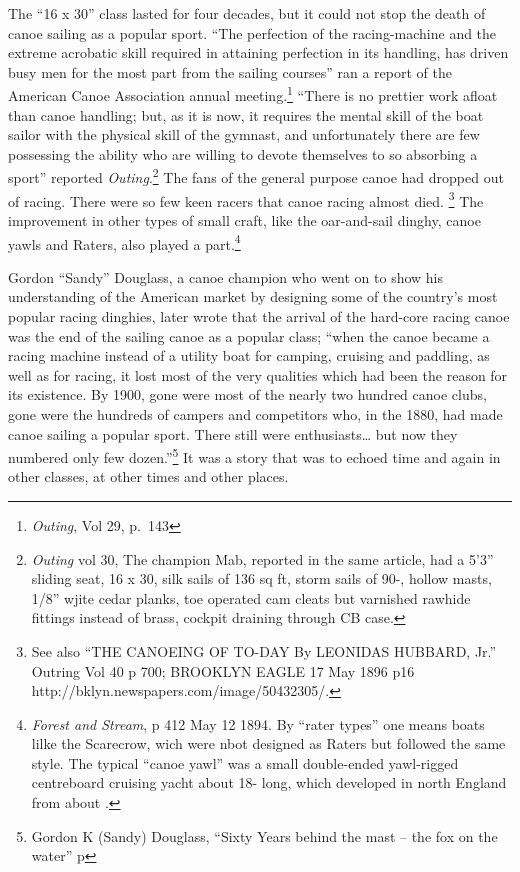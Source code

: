\documentclass[
  letterpaper,
]{scrbook}
\begin{document}
The ``16 x 30'' class lasted for four decades, but it could not stop the
death of canoe sailing as a popular sport. ``The perfection of the
racing-machine and the extreme acrobatic skill required in attaining
perfection in its handling, has driven busy men for the most part from
the sailing courses'' ran a report of the American Canoe Association
annual meeting.\footnote{\emph{Outing}, Vol 29, p.~143} ``There is no
prettier work afloat than canoe handling; but, as it is now, it requires
the mental skill of the boat sailor with the physical skill of the
gymnast, and unfortunately there are few possessing the ability who are
willing to devote themselves to so absorbing a sport'' reported
\emph{Outing}.\footnote{\emph{Outing} vol 30, The champion Mab, reported
  in the same article, had a 5'3'' sliding seat, 16 x 30, silk sails of
  136 sq ft, storm sails of 90-, hollow masts, 1/8'' wjite cedar planks,
  toe operated cam cleats but varnished rawhide fittings instead of
  brass, cockpit draining through CB case.} The fans of the general
purpose canoe had dropped out of racing. There were so few keen racers
that canoe racing almost died. \footnote{See also ``THE CANOEING OF
  TO-DAY By LEONIDAS HUBBARD, Jr.'' Outring Vol 40 p 700; BROOKLYN EAGLE
  17 May 1896 p16 http://bklyn.newspapers.com/image/50432305/.} The
improvement in other types of small craft, like the oar-and-sail dinghy,
canoe yawls and Raters, also played a part.\footnote{\emph{Forest and
  Stream}, p 412 May 12 1894. By ``rater types'' one means boats lilke
  the Scarecrow, wich were nbot designed as Raters but followed the same
  style. The typical ``canoe yawl'' was a small double-ended yawl-rigged
  centreboard cruising yacht about 18- long, which developed in north
  England from about .}

Gordon ``Sandy'' Douglass, a canoe champion who went on to show his
understanding of the American market by designing some of the country's
most popular racing dinghies, later wrote that the arrival of the
hard-core racing canoe was the end of the sailing canoe as a popular
class; ``when the canoe became a racing machine instead of a utility
boat for camping, cruising and paddling, as well as for racing, it lost
most of the very qualities which had been the reason for its existence.
By 1900, gone were most of the nearly two hundred canoe clubs, gone were
the hundreds of campers and competitors who, in the 1880, had made canoe
sailing a popular sport. There still were enthusiasts\ldots{} but now
they numbered only few dozen.''\footnote{Gordon K (Sandy) Douglass,
  ``Sixty Years behind the mast -- the fox on the water'' p} It was a
story that was to echoed time and again in other classes, at other times
and other places.
\end{document}
